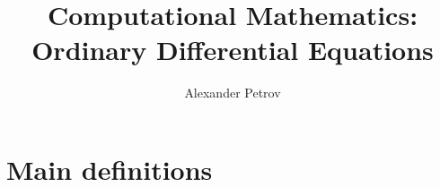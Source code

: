 \documentclass[a4paper,11pt]{article} %
\author{Alexander Petrov}
\title{Computational Mathematics: Ordinary Differential Equations}
\theoremstyle{plain} %
\theoremstyle{definition} %
\theoremstyle{remark} %
\begin{document}
\maketitle

\newpage

\tableofcontents

\newpage

\section{Main definitions}
\end{document}
